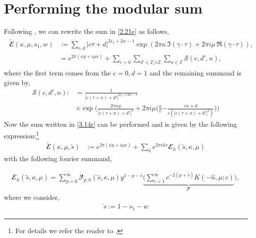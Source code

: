 \documentclass[12 pt]{article}
\begin{document}
\section{{Performing the modular sum}}
\label{appB}Following \cite{Maloney:2007ud}, we can rewrite the sum in \eqref{2.21e} as follows,
\begin{align}
\begin{split}
   \tilde{\mathbfcal{E} }(\kappa,\mu,s_1,w)&:=\sum_{c,d}|c\tau+d|^{{2s_1+2w-1}}\exp(2\pi \kappa \,\Im(\gamma\cdot\tau)+2\pi i \mu\, \Re(\gamma\cdot \tau)),\\&
    =e^{2\pi(\kappa y+i\mu x)}+\sum_{c>0}\sum_{d'\in \mathbb{Z}/c\mathbb{Z}}\sum_{n\in \mathbb{Z}}\mathcal{S}(c,d',n)\label{3.14r},
\end{split}
\end{align}
    where the first term comes from the $c=0,d=1$ and the remaining summand is given by,
    \begin{align}
        \mathcal{S}(c,d',n):&=\frac{1}{|c(\tau+n)+d'|^{2s_1+2w-1}}\,\\&\times\exp\Bigg(\frac{2\pi \kappa y}{|c(\tau+n)+d'|^{2}}+{2\pi i\mu}\Bigg(\frac{a}{c}{-\frac{cx+d}{c(|c(\tau+n)+d'|^2)}}\Bigg)\Bigg)
    \end{align}
Now the sum written in \eqref{3.14r} can be performed and is given by the following expression:\footnote{For details we refer the reader to \cite{Maloney:2007ud}.} 
\begin{align}
    \tilde{\mathbfcal{E} }(\kappa,\mu,\tilde s)&:=e^{2\pi(\kappa y+i\mu x)}+\sum_{\hat n}e^{2\pi i\hat n x}\mathbfcal{E}_{\hat n}(\tilde s,\kappa,\mu)
\end{align}
 with the following fourier summand,

 \begin{align}
     \mathbfcal{E}_{\hat n}(\tilde s,\kappa,\mu)=\sum_{p=0}^\infty \mathbfcal{I}_{p,\hat n}(\tilde s,\kappa,\mu)y^{1-p-\tilde s}\underbrace{\Bigg(\sum_{c=1}^\infty c^{-2(p+ \tilde s)}K(-\hat n,\mu;c)}_{\mathbfcal{T}}\Bigg),\label{3.8u}
 \end{align}
 where we consider,
\begin{align}
    \tilde s:=1-s_1-w
\end{align}
\end{document}
